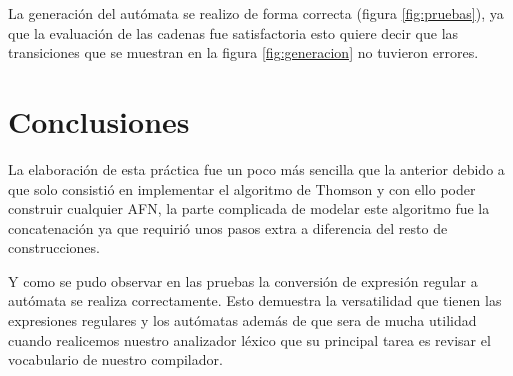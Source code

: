 \documentclass[titlepage]{article}
\begin{document}
  La generación del autómata se realizo de forma correcta (figura \ref{fig:pruebas}), ya que la evaluación de las cadenas fue satisfactoria esto quiere decir que las transiciones 
  que se muestran en la figura \ref{fig:generacion} no tuvieron errores.
  
  \section{Conclusiones}
  La elaboración de esta práctica fue un poco más sencilla que la anterior debido a que solo consistió en implementar el algoritmo de Thomson 
  y con ello poder construir cualquier AFN, la parte complicada de modelar este algoritmo fue la concatenación ya que requirió unos pasos extra 
  a diferencia del resto de construcciones. 
  
  Y como se pudo observar en las pruebas la conversión de expresión regular a autómata se realiza correctamente. 
  Esto demuestra la versatilidad que tienen las expresiones regulares y los autómatas además de que sera de 
  mucha utilidad cuando realicemos nuestro analizador léxico que su principal tarea es revisar el vocabulario de nuestro compilador.
   
  
\end{document}
